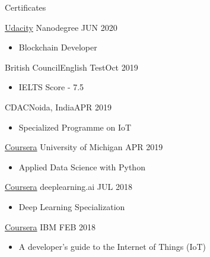 \documentclass[]{mcdowellcv}
\begin{document}
	
	\begin{cvsection}{Certificates}
		\begin{cvsubsection}{\href{https://graduation.udacity.com/confirm/DTZZCCYZ}{Udacity}}
			{Nanodegree}
			{JUN 2020}
			\begin{itemize}
				\item Blockchain Developer
			\end{itemize}
		\end{cvsubsection}
		\begin{cvsubsection}{British Council}{English Test}{Oct 2019}
			\begin{itemize}
				\item IELTS Score - 7.5
			\end{itemize}
		\end{cvsubsection}
		\begin{cvsubsection}{CDAC}{Noida, India}{APR 2019}
			\begin{itemize}
				\item Specialized Programme on IoT
			\end{itemize}
		\end{cvsubsection}
		\begin{cvsubsection}{\href{https://www.coursera.org/account/accomplishments/specialization/certificate/54XBCHQ9B8LY}{Coursera}}
			{University of Michigan}
			{APR 2019}
			\begin{itemize}
				\item Applied Data Science with Python
			\end{itemize}
		\end{cvsubsection}
		\begin{cvsubsection}
			{\href{https://www.coursera.org/account/accomplishments/specialization/certificate/LXSXVVTWLGMQ}{Coursera}}
			{deeplearning.ai}
			{JUL 2018}
			\begin{itemize}
				\item Deep Learning Specialization
			\end{itemize}
		\end{cvsubsection}
		\begin{cvsubsection}
			{\href{https://www.youracclaim.com/badges/95fb9f77-9229-4909-bae7-8900f7d605eb/public_url}
				{Coursera}}
			{IBM}
			{FEB 2018}
			\begin{itemize}
				\item A developer's guide to the Internet of Things (IoT)
			\end{itemize}
		\end{cvsubsection}
		\begin{cvsubsection}

\end{cvsubsection}
\end{cvsection}
\end{document}
